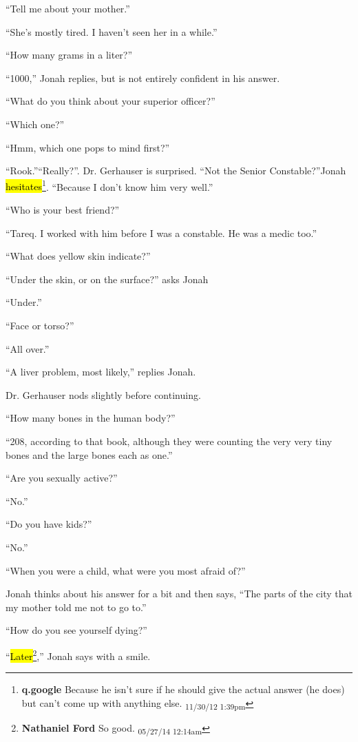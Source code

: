``Tell me about your mother.''

``She's mostly tired.  I haven't seen her in a while.''

``How many grams in a liter?''

``1000,'' Jonah replies, but is not entirely confident in his answer.

``What do you think about your superior officer?''

``Which one?''

``Hmm, which one pops to mind first?''

``Rook.''``Really?''.  Dr. Gerhauser is surprised. ``Not the Senior Constable?''Jonah \hl{hesitates}\footnote{\textbf{q.google }Because he isn't sure if he should give the actual answer (he does) but can't come up with anything else. \textsubscript{11/30/12 1:39pm}}.  ``Because I don't know him very well.''

``Who is your best friend?''

``Tareq.  I worked with him before I was a constable.  He was a medic too.''

``What does yellow skin indicate?''

``Under the skin, or on the surface?'' asks Jonah

``Under.''

``Face or torso?''

``All over.''

``A liver problem, most likely,'' replies Jonah.

Dr. Gerhauser nods slightly before continuing.

``How many bones in the human body?''

``208, according to that book, although they were counting the very very tiny bones and the large bones each as one.''

``Are you sexually active?''

``No.''

``Do you have kids?''

``No.''

``When you were a child, what were you most afraid of?''

Jonah thinks about his answer for a bit and then says, ``The parts of the city that my mother told me not to go to.''

``How do you see yourself dying?''

``\hl{Later}\footnote{\textbf{Nathaniel Ford }So good. \textsubscript{05/27/14 12:14am}},'' Jonah says with a smile. 



